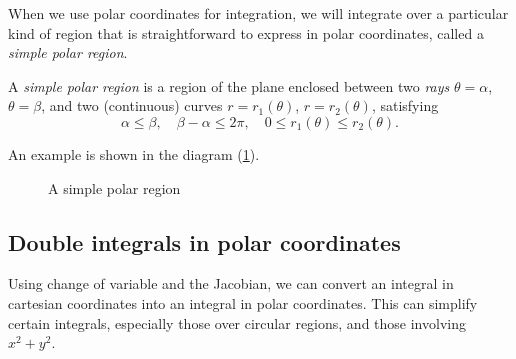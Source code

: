   When we use polar coordinates for integration, we will integrate over a particular kind of region that is straightforward to express in polar coordinates, called a \emph{simple polar region}.
  
  \begin{definition}
    A \emph{simple polar region} is a region of the plane enclosed between two \emph{rays} $\theta = \alpha$, $\theta = \beta$, and two (continuous) curves $r = r_1(\theta)$, $r = r_2(\theta)$, satisfying
    \[
      \alpha \leq \beta, \quad \beta - \alpha \leq 2\pi, \quad 0 \leq r_1(\theta) \leq r_2(\theta).
    \]
  \end{definition}
  
  An example is shown in the diagram (\ref{simplepolarregion}).
  
  \begin{figure}[H]
    \centering
    \def\svgwidth{0.7\columnwidth}
    
    \caption{A simple polar region}
    \label{simplepolarregion}
  \end{figure}


\subsection{Double integrals in polar coordinates}

  Using change of variable and the Jacobian, we can convert an integral in cartesian coordinates into an integral in polar coordinates.  This can simplify certain integrals, especially those over circular regions, and those involving $x^2 + y^2$.

